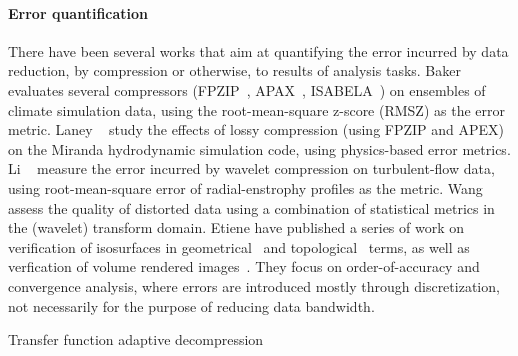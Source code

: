 \paragraph{\textbf{Error quantification}}
There have been several works that aim at quantifying the error incurred by data reduction, by
compression or otherwise, to results of analysis tasks. Baker
\etal~\cite{evauating-compression-climate} evaluates several compressors (FPZIP~\cite{fpzip},
APAX~\cite{apax}, ISABELA~\cite{isabela}) on ensembles of climate simulation data, using the
root-mean-square z-score (RMSZ) as the error metric. Laney \etal~\cite{compression_sim2013} study
the effects of lossy compression (using FPZIP and APEX) on the Miranda hydrodynamic simulation code,
using physics-based error metrics. Li \etal~\cite{evaluating-efficacy-wavelet} measure the error
incurred by wavelet compression on turbulent-flow data, using root-mean-square error of
radial-enstrophy profiles as the metric. Wang \etal~\cite{statistical-volume-quality} assess the
quality of distorted data using a combination of statistical metrics in the (wavelet) transform
domain. Etiene \etal have published a series of work on verification of isosurfaces in
geometrical~\cite{verifiable-isosurface} and topological~\cite{topology-verification-isosurface}
terms, as well as verfication of volume rendered images~\cite{verifying-volume-rendering}. They
focus on order-of-accuracy and convergence analysis, where errors are introduced mostly through
discretization, not necessarily for the purpose of reducing data bandwidth. ~\cite{z-checker}


Transfer function adaptive decompression~\cite{tf_decompression2004}
